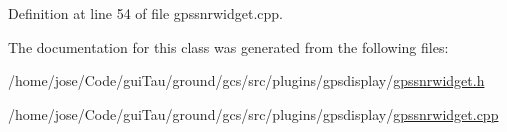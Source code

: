 Definition at line 54 of file gpssnrwidget.\-cpp.



The documentation for this class was generated from the following files\-:\begin{DoxyCompactItemize}
\item 
/home/jose/\-Code/gui\-Tau/ground/gcs/src/plugins/gpsdisplay/\hyperlink{gpssnrwidget_8h}{gpssnrwidget.\-h}\item 
/home/jose/\-Code/gui\-Tau/ground/gcs/src/plugins/gpsdisplay/\hyperlink{gpssnrwidget_8cpp}{gpssnrwidget.\-cpp}\end{DoxyCompactItemize}
